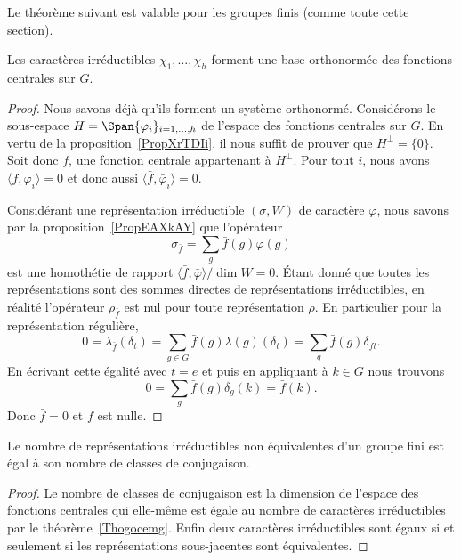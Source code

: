 Le théorème suivant est valable pour les groupes finis (comme toute cette section).
\begin{theorem}  \label{Thogocemg}
	Les caractères irréductibles \( \chi_1,\ldots, \chi_h\) forment une base orthonormée des fonctions centrales sur \( G\).
\end{theorem}

\begin{proof}
	Nous savons déjà qu'ils forment un système orthonormé. Considérons le sous-espace \( H=\Span\{ \varphi_i \}_{i=1,\ldots, h}\) de l'espace des fonctions centrales sur \( G\). En vertu de la proposition~\ref{PropXrTDIi}, il nous suffit de prouver que \( H^{\perp}=\{ 0 \}\). Soit donc \( f\), une fonction centrale appartenant à \( H^{\perp}\). Pour tout \( i\), nous avons \( \langle f, \varphi_i\rangle =0\) et donc aussi \( \langle \bar f, \bar\varphi_i\rangle =0\).

	Considérant une représentation irréductible \( (\sigma,W)\) de caractère \( \varphi\), nous savons par la proposition~\ref{PropEAXkAY} que l'opérateur
	\begin{equation}
		\sigma_{\bar f}=\sum_g\bar f(g)\varphi(g)
	\end{equation}
	est une homothétie de rapport \( \langle \bar f, \bar\varphi\rangle/\dim W=0\). Étant donné que toutes les représentations sont des sommes directes de représentations irréductibles, en réalité l'opérateur \( \rho_{\bar f}\) est nul pour toute représentation \( \rho\). En particulier pour la représentation régulière,
	\begin{equation}
		0=\lambda_{\bar f}(\delta_t)=\sum_{g\in G}\bar f(g)\lambda(g)(\delta_t)=\sum_g\bar f(g)\delta_{ft}.
	\end{equation}
	En écrivant cette égalité avec \( t=e\) et puis en appliquant à \( k\in G\) nous trouvons
	\begin{equation}
		0=\sum_g\bar f(g)\delta_g(k)=\bar f(k).
	\end{equation}
	Donc \( \bar f=0\) et \( f\) est nulle.
\end{proof}

\begin{corollary}   \label{CorbdcVNC}
	Le nombre de représentations irréductibles non équivalentes d'un groupe fini est égal à son nombre de classes de conjugaison.
\end{corollary}

\begin{proof}
	Le nombre de classes de conjugaison est la dimension de l'espace des fonctions centrales qui elle-même est égale au nombre de caractères irréductibles par le théorème~\ref{Thogocemg}. Enfin deux caractères irréductibles sont égaux si et seulement si les représentations sous-jacentes sont équivalentes.
\end{proof}

